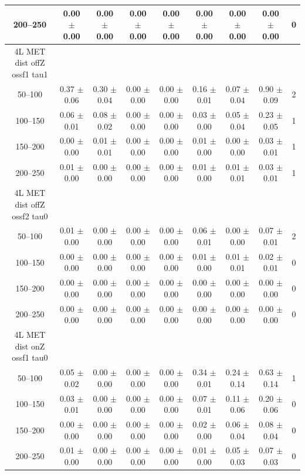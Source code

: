\begin{table}
\begin{center}
\begin{tabular}{|c|cccccc|c|c|}
200--250 & 0.00 $\pm$ 0.00 & 0.00 $\pm$ 0.00 & 0.00 $\pm$ 0.00 & 0.00 $\pm$ 0.00 & 0.00 $\pm$ 0.00 & 0.00 $\pm$ 0.00 & 0.00 $\pm$ 0.00 & 0 \\
\hline
4L MET dist offZ ossf1 tau1\\
50--100 & 0.37 $\pm$ 0.06 & 0.30 $\pm$ 0.04 & 0.00 $\pm$ 0.00 & 0.00 $\pm$ 0.00 & 0.16 $\pm$ 0.01 & 0.07 $\pm$ 0.04 & 0.90 $\pm$ 0.09 & 2 \\
100--150 & 0.06 $\pm$ 0.01 & 0.08 $\pm$ 0.02 & 0.00 $\pm$ 0.00 & 0.00 $\pm$ 0.00 & 0.03 $\pm$ 0.00 & 0.05 $\pm$ 0.04 & 0.23 $\pm$ 0.05 & 1 \\
150--200 & 0.00 $\pm$ 0.00 & 0.01 $\pm$ 0.01 & 0.00 $\pm$ 0.00 & 0.00 $\pm$ 0.00 & 0.01 $\pm$ 0.00 & 0.00 $\pm$ 0.00 & 0.03 $\pm$ 0.01 & 1 \\
200--250 & 0.01 $\pm$ 0.00 & 0.00 $\pm$ 0.00 & 0.00 $\pm$ 0.00 & 0.00 $\pm$ 0.00 & 0.01 $\pm$ 0.00 & 0.01 $\pm$ 0.01 & 0.03 $\pm$ 0.01 & 1 \\
\hline
4L MET dist offZ ossf2 tau0\\
50--100 & 0.01 $\pm$ 0.00 & 0.00 $\pm$ 0.00 & 0.00 $\pm$ 0.00 & 0.00 $\pm$ 0.00 & 0.06 $\pm$ 0.01 & 0.00 $\pm$ 0.00 & 0.07 $\pm$ 0.01 & 2 \\
100--150 & 0.00 $\pm$ 0.00 & 0.00 $\pm$ 0.00 & 0.00 $\pm$ 0.00 & 0.00 $\pm$ 0.00 & 0.01 $\pm$ 0.00 & 0.01 $\pm$ 0.01 & 0.02 $\pm$ 0.01 & 0 \\
150--200 & 0.00 $\pm$ 0.00 & 0.00 $\pm$ 0.00 & 0.00 $\pm$ 0.00 & 0.00 $\pm$ 0.00 & 0.00 $\pm$ 0.00 & 0.00 $\pm$ 0.00 & 0.00 $\pm$ 0.00 & 0 \\
200--250 & 0.00 $\pm$ 0.00 & 0.00 $\pm$ 0.00 & 0.00 $\pm$ 0.00 & 0.00 $\pm$ 0.00 & 0.00 $\pm$ 0.00 & 0.00 $\pm$ 0.00 & 0.00 $\pm$ 0.00 & 0 \\
\hline
4L MET dist onZ ossf1 tau0\\
50--100 & 0.05 $\pm$ 0.02 & 0.00 $\pm$ 0.00 & 0.00 $\pm$ 0.00 & 0.00 $\pm$ 0.00 & 0.34 $\pm$ 0.01 & 0.24 $\pm$ 0.14 & 0.63 $\pm$ 0.14 & 1 \\
100--150 & 0.03 $\pm$ 0.01 & 0.00 $\pm$ 0.00 & 0.00 $\pm$ 0.00 & 0.00 $\pm$ 0.00 & 0.07 $\pm$ 0.01 & 0.11 $\pm$ 0.06 & 0.20 $\pm$ 0.06 & 0 \\
150--200 & 0.00 $\pm$ 0.00 & 0.00 $\pm$ 0.00 & 0.00 $\pm$ 0.00 & 0.00 $\pm$ 0.00 & 0.02 $\pm$ 0.00 & 0.06 $\pm$ 0.04 & 0.08 $\pm$ 0.04 & 0 \\
200--250 & 0.01 $\pm$ 0.00 & 0.00 $\pm$ 0.00 & 0.00 $\pm$ 0.00 & 0.00 $\pm$ 0.00 & 0.01 $\pm$ 0.00 & 0.05 $\pm$ 0.03 & 0.07 $\pm$ 0.03 & 0 \\
\hline

\end{tabular}
\end{center}
\end{table}
